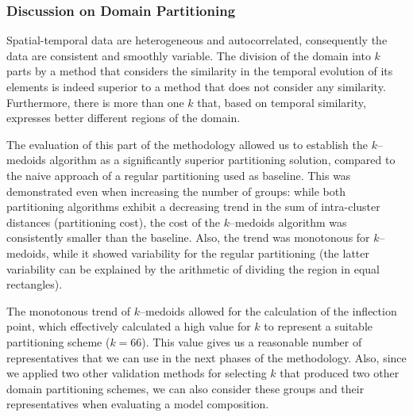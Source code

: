 \subsubsection{Discussion on Domain Partitioning}
\label{Sec:DomainPartitioningDiscussion}

Spatial-temporal data are heterogeneous and autocorrelated, consequently the data are consistent and smoothly variable. The division of the domain into $k$ parts by a method that considers the similarity in the temporal evolution of its elements is indeed superior to a method that does not consider any similarity. Furthermore, there is more than one $k$ that, based on temporal similarity, expresses better different regions of the domain. 

The evaluation of this part of the methodology allowed us to establish the $k$--medoids algorithm as a significantly superior partitioning solution, compared to the naive approach of a regular partitioning used as baseline. This was demonstrated even when increasing the number of groups: while both partitioning algorithms exhibit a decreasing trend in the sum of intra-cluster distances (partitioning cost), the cost of the $k$--medoids algorithm was consistently smaller than the baseline. Also, the trend was monotonous for $k$--medoids, while it showed variability for the regular partitioning (the latter variability can be explained by the arithmetic of dividing the region in equal rectangles). 

The monotonous trend of $k$--medoids allowed for the calculation of the inflection point, which effectively calculated a high value for $k$ to represent a suitable partitioning scheme ($k = 66$). This value gives us a reasonable number of representatives that we can use in the next phases of the methodology. Also, since we applied two other validation methods for selecting $k$ that produced two other domain partitioning schemes, we can also consider these groups and their representatives when evaluating a model composition.  %


